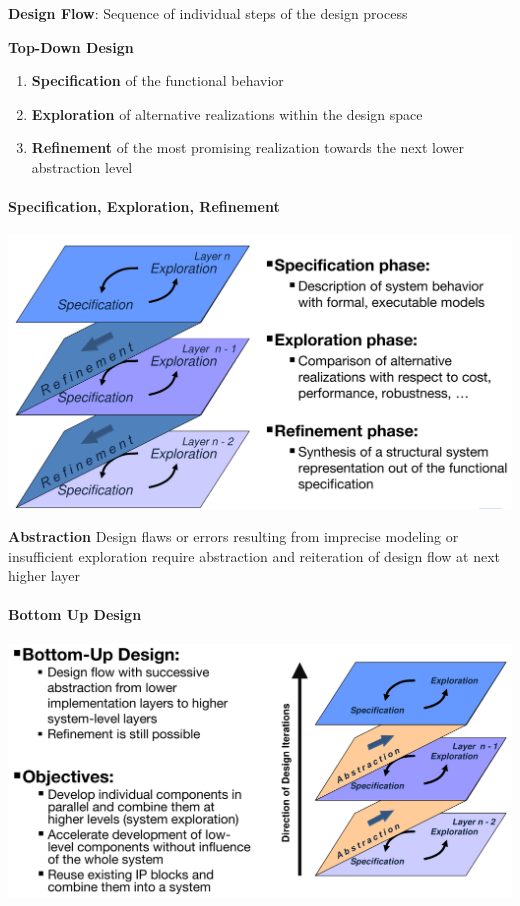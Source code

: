 \documentclass[english]{latex4ei/latex4ei_sheet}
\begin{document}
\textbf{Design Flow}: Sequence of individual steps of the design process

\textbf{Top-Down Design}
\begin{enumerate}
		\item \textbf{Specification} of the functional behavior
		\item \textbf{Exploration} of alternative realizations within the design space
		\item \textbf{Refinement} of the most promising realization towards the next lower abstraction level
\end{enumerate}

\paragraph{Specification, Exploration, Refinement}

\begin{center}
  \includegraphics[width=0.8\linewidth]{assets/SpecExRef.png}
\end{center}

\textbf{Abstraction} Design flaws or errors resulting from imprecise modeling or insufficient exploration require abstraction and reiteration of design flow at next higher layer
 
\paragraph{Bottom Up Design}

\begin{center}
  \includegraphics[width=0.8\linewidth]{assets/BottomUpDesign.png}
\end{center}
 
\end{document}
